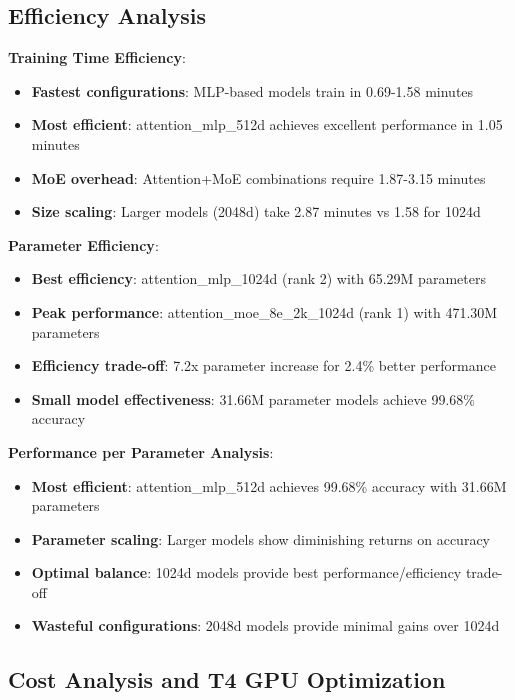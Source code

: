 \documentclass[11pt,a4paper]{article}
\begin{document}
\subsection{Efficiency Analysis}

\textbf{Training Time Efficiency}:
\begin{itemize}
    \item \textbf{Fastest configurations}: MLP-based models train in 0.69-1.58 minutes
    \item \textbf{Most efficient}: attention\_mlp\_512d achieves excellent performance in 1.05 minutes
    \item \textbf{MoE overhead}: Attention+MoE combinations require 1.87-3.15 minutes
    \item \textbf{Size scaling}: Larger models (2048d) take 2.87 minutes vs 1.58 for 1024d
\end{itemize}

\textbf{Parameter Efficiency}:
\begin{itemize}
    \item \textbf{Best efficiency}: attention\_mlp\_1024d (rank 2) with 65.29M parameters
    \item \textbf{Peak performance}: attention\_moe\_8e\_2k\_1024d (rank 1) with 471.30M parameters
    \item \textbf{Efficiency trade-off}: 7.2x parameter increase for 2.4\% better performance
    \item \textbf{Small model effectiveness}: 31.66M parameter models achieve 99.68\% accuracy
\end{itemize}

\textbf{Performance per Parameter Analysis}:
\begin{itemize}
    \item \textbf{Most efficient}: attention\_mlp\_512d achieves 99.68\% accuracy with 31.66M parameters
    \item \textbf{Parameter scaling}: Larger models show diminishing returns on accuracy
    \item \textbf{Optimal balance}: 1024d models provide best performance/efficiency trade-off
    \item \textbf{Wasteful configurations}: 2048d models provide minimal gains over 1024d
\end{itemize}

\subsection{Cost Analysis and T4 GPU Optimization}
\end{document}
